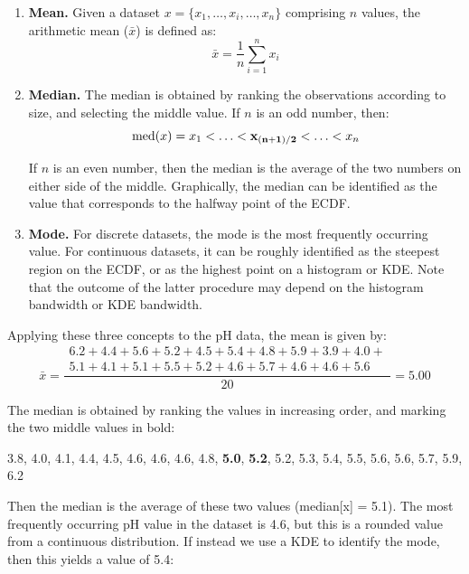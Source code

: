 \begin{enumerate}
\item{\bf Mean.} Given a dataset $x = \{x_1,\ldots ,x_i,\ldots, x_n\}$
  comprising $n$ values, the arithmetic mean ($\bar{x}$) is defined
  as:
  \begin{equation}
    \bar{x} = \frac{1}{n}\sum\limits_{i=1}^{n}x_i
    \label{eq:mean}
  \end{equation}
\item{\bf Median.} The median is obtained by ranking the observations
  according to size, and selecting the middle value. If $n$ is an odd
  number, then:
  \begin{equation}
    \mbox{med}(x) = x_1 < \ldots < {\bf x_{(n+1)/2}} < \ldots < x_n
  \end{equation}

  If $n$ is an even number, then the median is the average of the two
  numbers on either side of the middle. Graphically, the median can be
  identified as the value that corresponds to the halfway point of the
  ECDF.
  
\item{\bf Mode.} For discrete datasets, the mode is the most
  frequently occurring value. For continuous datasets, it can be
  roughly identified as the steepest region on the ECDF, or as the
  highest point on a histogram or KDE. Note that the outcome of the
  latter procedure may depend on the histogram bandwidth or KDE
  bandwidth.
\end{enumerate}

Applying these three concepts to the pH data, the mean is given by:
\begin{equation*}
  \bar{x} = \frac{
    \begin{array}{c}
      6.2+4.4+5.6+5.2+4.5+5.4+4.8+5.9+3.9+4.0+ \\
      5.1+4.1+5.1+5.5+5.2+4.6+5.7+4.6+4.6+5.6
    \end{array}
  }{20} = 5.00
\end{equation*}

The median is obtained by ranking the values in increasing order, and
marking the two middle values in bold:

\begin{center}
  {3.8, 4.0, 4.1, 4.4, 4.5, 4.6, 4.6, 4.6, 4.8, \textbf{5.0},
  \textbf{5.2}, 5.2, 5.3, 5.4, 5.5, 5.6, 5.6, 5.7, 5.9, 6.2}
\end{center}

Then the median is the average of these two values (median[x] =
5.1). The most frequently occurring pH value in the dataset is 4.6,
but this is a rounded value from a continuous distribution. If instead
we use a KDE to identify the mode, then this yields a value of 5.4:

